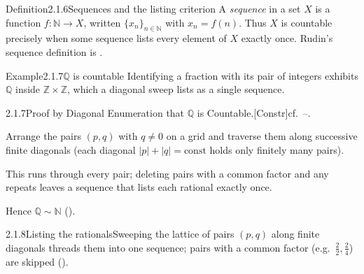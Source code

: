 \documentclass[main.tex]{subfiles}
\begin{document}
\begin{Obj}{Definition}{2.1.6}{Sequences and the listing criterion}
A \emph{sequence} in a set $X$ is a function $f:\mathbb N\to X$, written $\{x_n\}_{n\in\mathbb N}$ with
$x_n=f(n)$. Thus $X$ is countable precisely when some sequence lists every element of $X$ exactly once.
Rudin's sequence definition is .
\end{Obj}

\begin{ObjL}{Example}{2.1.7}{$\mathbb Q$ is countable}
Identifying a fraction with its pair of integers exhibits $\mathbb Q$ inside
$\mathbb Z\times\mathbb Z$, which a diagonal sweep lists as a single sequence.
\end{ObjL}
\begin{Prf}{2.1.7}{Proof by Diagonal Enumeration that $\mathbb Q$ is Countable.}{[Constr]\quad cf.\ --.}
\item Arrange the pairs $(p,q)$ with $q\neq0$ on a grid and traverse them along successive finite
  diagonals (each diagonal $|p|+|q|=\text{const}$ holds only finitely many pairs).
\item This runs through every pair; deleting pairs with a common factor and any repeats leaves a
  sequence that lists each rational exactly once.
\item Hence $\mathbb Q\sim\mathbb N$ ().
\end{Prf}

\begin{Fig}{2.1.8}{Listing the rationals}{Sweeping the lattice of pairs $(p,q)$ along finite diagonals threads them into one sequence; pairs with a common factor (e.g.\ $\tfrac22,\tfrac24$) are skipped ().}
\end{Fig}
\end{document}
